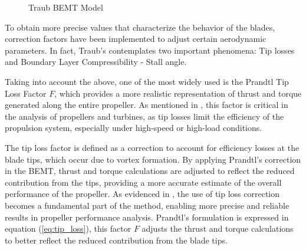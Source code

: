 \documentclass{Format}
\begin{document}
\begin{figure}[H]
    \caption{Traub BEMT Model}
    \label{fig:Traub}
\end{figure}

To obtain more precise values that characterize the behavior of the blades, correction factors have been implemented to adjust certain aerodynamic parameters. In fact, Traub's contemplates two important phenomena: Tip losses and Boundary Layer Compressibility - Stall angle.

Taking into account the above, one of the most widely used is the Prandtl Tip Loss Factor \( F \), which provides a more realistic representation of thrust and torque generated along the entire propeller. As mentioned in \cite{burton2011wind}, this factor is critical in the analysis of propellers and turbines, as tip losses limit the efficiency of the propulsion system, especially under high-speed or high-load conditions. 

The tip loss factor is defined as a correction to account for efficiency losses at the blade tips, which occur due to vortex formation. By applying Prandtl’s correction in the BEMT, thrust and torque calculations are adjusted to reflect the reduced contribution from the tips, providing a more accurate estimate of the overall performance of the propeller. As evidenced in \cite{traub2016}, the use of tip loss correction becomes a fundamental part of the method, enabling more precise and reliable results in propeller performance analysis. Prandtl’s formulation is expressed in equation (\ref{eq:tip_loss}), this factor \( F \) adjusts the thrust and torque calculations to better reflect the reduced contribution from the blade tips.
\end{document}
